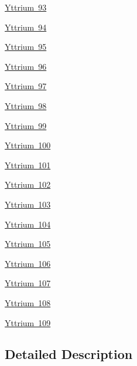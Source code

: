 \begin{DoxyCompactItemize}
\mbox{\hyperlink{group___isotope_const-_yttrium-_y93}{Yttrium 93}}
\item 
\mbox{\hyperlink{group___isotope_const-_yttrium-_y94}{Yttrium 94}}
\item 
\mbox{\hyperlink{group___isotope_const-_yttrium-_y95}{Yttrium 95}}
\item 
\mbox{\hyperlink{group___isotope_const-_yttrium-_y96}{Yttrium 96}}
\item 
\mbox{\hyperlink{group___isotope_const-_yttrium-_y97}{Yttrium 97}}
\item 
\mbox{\hyperlink{group___isotope_const-_yttrium-_y98}{Yttrium 98}}
\item 
\mbox{\hyperlink{group___isotope_const-_yttrium-_y99}{Yttrium 99}}
\item 
\mbox{\hyperlink{group___isotope_const-_yttrium-_y100}{Yttrium 100}}
\item 
\mbox{\hyperlink{group___isotope_const-_yttrium-_y101}{Yttrium 101}}
\item 
\mbox{\hyperlink{group___isotope_const-_yttrium-_y102}{Yttrium 102}}
\item 
\mbox{\hyperlink{group___isotope_const-_yttrium-_y103}{Yttrium 103}}
\item 
\mbox{\hyperlink{group___isotope_const-_yttrium-_y104}{Yttrium 104}}
\item 
\mbox{\hyperlink{group___isotope_const-_yttrium-_y105}{Yttrium 105}}
\item 
\mbox{\hyperlink{group___isotope_const-_yttrium-_y106}{Yttrium 106}}
\item 
\mbox{\hyperlink{group___isotope_const-_yttrium-_y107}{Yttrium 107}}
\item 
\mbox{\hyperlink{group___isotope_const-_yttrium-_y108}{Yttrium 108}}
\item 
\mbox{\hyperlink{group___isotope_const-_yttrium-_y109}{Yttrium 109}}
\end{DoxyCompactItemize}


\subsection{Detailed Description}
